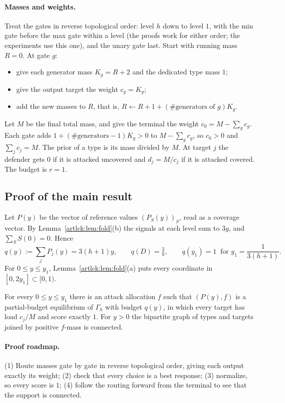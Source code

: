 \paragraph{Masses and weights.} Treat the gates in reverse topological order: level $h$ down to level
$1$, with the min gate before the max gate within a level (the proofs work for either order; the experiments use this one), and the unary gate last. Start with running mass $R=0$. At gate $g$:
\begin{itemize}[nosep]
\item give each generator mass $K_g=R+2$ and the dedicated type mass $1$;
\item give the output target the weight $c_g=K_g$;
\item add the new masses to $R$, that is, $R\leftarrow R+1+(\#\text{generators of }g)K_g$.
\end{itemize}
Let $M$ be the final total mass, and give the terminal the weight $c_0=M-\sum_{g}c_g$. Each gate adds
$1+(\#\text{generators}-1)K_g>0$ to $M-\sum_gc_g$, so $c_0>0$ and $\sum_jc_j=M$. The prior of a type is
its mass divided by $M$. At target $j$ the defender gets $0$ if it is attacked uncovered and $d_j=M/c_j$
if it is attacked covered. The budget is $r=1$.

\subsection{Proof of the main result}\label{artlck:sec:proof}

Let $P(y)$ be the vector of reference values $(P_S(y))_S$, read as a coverage vector. By
Lemma~\ref{artlck:lem:fold}(b) the signals at each level sum to $3y$, and $\sum_SS(0)=0$. Hence
\[
 q(y):=\sum_jP_j(y)=3(h+1)y,\qquad q(D)=\tfrac38,\qquad q(y_1)=1\ \text{ for } y_1=\frac1{3(h+1)} .
\]
For $0\le y\le y_1$, Lemma~\ref{artlck:lem:fold}(a) puts every coordinate in $[0,2y_1]\subset[0,1)$.

\begin{lemma}\label{artlck:lem:balanced}
\statusrefereed
For every $0\le y\le y_1$ there is an attack allocation $f$ such that $(P(y),f)$ is a partial-budget
equilibrium of $\Gamma_h$ with budget $q(y)$, in which every target has load $c_j/M$ and score exactly
$1$. For $y>0$ the bipartite graph of types and targets joined by positive $f$-mass is connected.
\end{lemma}

\paragraph{Proof roadmap.} (1) Route masses gate by gate in reverse topological order, giving each
output exactly its weight; (2) check that every choice is a best response; (3) normalize, so every score
is $1$; (4) follow the routing forward from the terminal to see that the support is connected.

